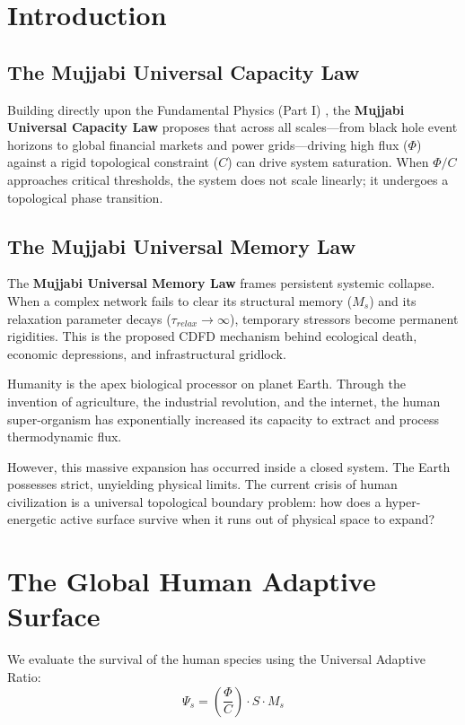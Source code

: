 \documentclass[11pt,a4paper]{article}
\begin{document}
\section{Introduction}

\subsection{The Mujjabi Universal Capacity Law}
Building directly upon the Fundamental Physics (Part I) \cite{MujjabiPartI2026}, the \textbf{Mujjabi Universal Capacity Law} proposes that across all scales---from black hole event horizons to global financial markets and power grids---driving high flux ($\Phi$) against a rigid topological constraint ($C$) can drive system saturation. When $\Phi/C$ approaches critical thresholds, the system does not scale linearly; it undergoes a topological phase transition.

\subsection{The Mujjabi Universal Memory Law}
The \textbf{Mujjabi Universal Memory Law} frames persistent systemic collapse. When a complex network fails to clear its structural memory ($M_s$) and its relaxation parameter decays ($\tau_{relax} \to \infty$), temporary stressors become permanent rigidities. This is the proposed CDFD mechanism behind ecological death, economic depressions, and infrastructural gridlock.

Humanity is the apex biological processor on planet Earth. Through the invention of agriculture, the industrial revolution, and the internet, the human super-organism has exponentially increased its capacity to extract and process thermodynamic flux.

However, this massive expansion has occurred inside a closed system. The Earth possesses strict, unyielding physical limits. The current crisis of human civilization is a universal topological boundary problem: how does a hyper-energetic active surface survive when it runs out of physical space to expand?

\section{The Global Human Adaptive Surface}
We evaluate the survival of the human species using the Universal Adaptive Ratio:
\begin{equation}
    \Psi_s = \left( \frac{\Phi}{C} \right) \cdot S \cdot M_s
\end{equation}
\end{document}

